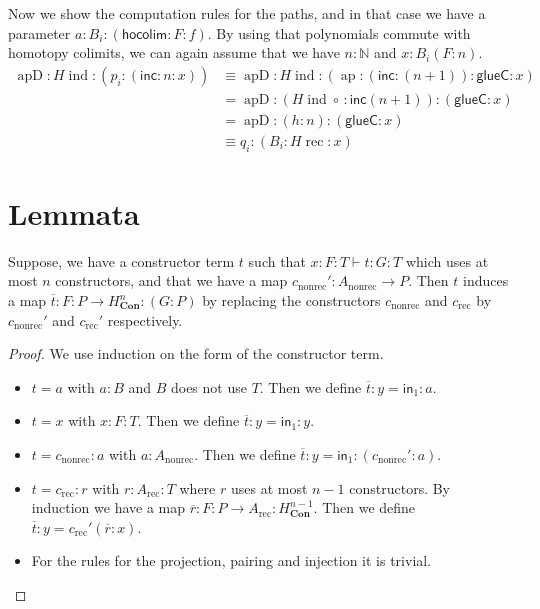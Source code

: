 \documentclass[a4paper,UKenglish]{lipics-v2016}
\newcommand{\Boperator}[1]{\mathsf{#1}}
\newcommand{\inn}{\Boperator{in}}
\newcommand{\comp}[0]{\circ \,}
\newcommand{\frec}[0]{\!\operatorname{rec}}
\newcommand{\ind}[0]{\!\operatorname{ind}}
\newcommand{\rec}[0]{\operatorname{rec}}
\newcommand{\nonrec}[0]{\operatorname{nonrec}}
\newcommand{\ap}[0]{\operatorname{ap}}
\newcommand{\apd}[0]{\operatorname{apD}}
\newcommand{\Con}[0]{\textbf{Con}}
\newcommand{\glueC}[0]{\Boperator{glueC}}
\newcommand{\hocolim}[0]{\Boperator{hocolim}}
\newcommand{\inc}[0]{\Boperator{inc}}
\begin{document}
Now we show the computation rules for the paths, and in that case we have a parameter $a : B_i : (\hocolim : F : f)$.
By using that polynomials commute with homotopy colimits, we can again assume that we have $n : \mathbb{N}$ and $x : B_i(F : n)$.
\begin{equation*}
\begin{split}
\apd : H\ind : (p_i : (\inc : n : x))
&\equiv \apd : H\ind : (\ap : (\inc : (n+1)) : \glueC : x)\\
&= \apd : (H\ind \comp  : \inc (n+1)) : (\glueC : x)\\
&= \apd : (h : n) : (\glueC : x)\\
&\equiv q_i : (B_i : H\frec : x)
\end{split}
\end{equation*}


\section{Lemmata}
\label{sec:Lemmata}
\begin{lemma}
\label{lem:constrTerm}
Suppose, we have a constructor term $t$ such that $x : F : T \vdash t : G :T$ which uses at most $n$ constructors, and that we have a map $c_{\nonrec}' : A_{\nonrec} \rightarrow P$.
Then $t$ induces a map $\overline{t} : F : P \rightarrow H_{\Con}^n : (G : P)$ by replacing the constructors $c_{\nonrec}$ and $c_{\rec}$ by $c_{\nonrec}'$ and $c_{\rec}'$ respectively.
\end{lemma}

\begin{proof}
We use induction on the form of the constructor term.
\begin{itemize}
        \item $t = a$ with $a : B$ and $B$ does not use $T$. Then we define $\overline{t} : y = \inn_1 : a$.
        \item $t = x$ with $x : F : T$. Then we define $\overline{t} : y = \inn_1 : y$.
        \item $t = c_{\nonrec} : a$ with $a : A_{\nonrec}$. Then we define $\overline{t} : y = \inn_1 : (c_{\nonrec}' : a)$.
        \item $t = c_{\rec} : r$ with $r : A_{\rec} : T$ where $r$ uses at most $n-1$ constructors. 
        By induction we have a map $\overline{r} : F : P \rightarrow A_{\rec} : H_{\Con}^{n-1}$.
        Then we define $\overline{t} : y = c_{\rec}' (\overline{r} : x)$.
        \item For the rules for the projection, pairing and injection it is trivial. \qedhere
\end{itemize}
\end{proof}
\end{document}
